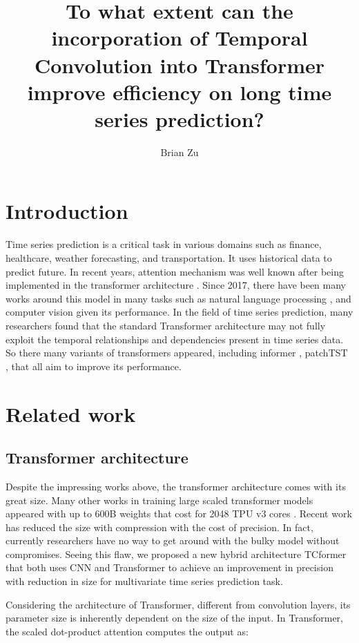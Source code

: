 \documentclass[stu,12pt,floatsintext]{apa7}
\title{To what extent can the incorporation of Temporal Convolution into Transformer improve efficiency on long time series prediction?}
\author{Brian Zu}
\affiliation{}
\begin{document}
\maketitle

\section{Introduction}
Time series prediction is a critical task in various domains such as finance, healthcare, weather forecasting, and transportation. It uses historical data to predict future. In recent years, attention mechanism was well known after being implemented in the transformer architecture \parencite{attention-is-all-you-need}. Since 2017, there have been many works around this model in many tasks such as natural language processing \parencite{few-shot-learners}, and computer vision \parencite{vit} given its performance.  In the field of time series prediction, many researchers found that the standard Transformer architecture may not fully exploit the temporal relationships and dependencies present in time series data. So there many variants of transformers appeared, including informer \parencite{informer}, patchTST \parencite{patchtst}, that all aim to improve its performance. 


\section{Related work}

\subsection{Transformer architecture}

Despite the impressing works above, the transformer architecture comes with its great size. Many other works in training large scaled transformer models appeared with up to 600B weights that cost for 2048 TPU v3 cores \parencite{lepikhin2020gshardscalinggiantmodels}. Recent work \parencite{pmlr-v119-li20m} has reduced the size with compression with the cost of precision. In fact, currently researchers have no way to get around with the bulky model without compromises. Seeing this flaw, we proposed a new hybrid architecture TCformer that both uses CNN and Transformer to achieve an improvement in precision with reduction in size for multivariate time series prediction task. 

Considering the architecture of Transformer, different from convolution layers, its parameter size is inherently dependent on the size of the input. In Transformer, the scaled dot-product attention \parencite{attention-is-all-you-need} computes the output as:
\end{document}
